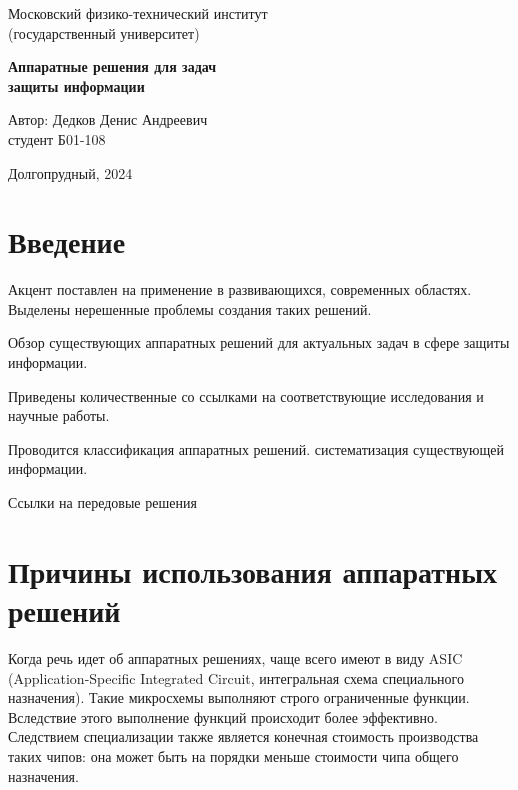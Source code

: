 \documentclass[a4paper,12pt]{article}
\begin{document}
	
\begin{center}
	
        \normalsize Московский физико-технический институт \\
						(государственный университет)
	\vspace{46ex}
	

	\Large \textbf{Аппаратные решения для задач \\ защиты информации}

	\vspace{40ex}
\end{center}
\begin{flushright}
	\normalsize{Автор: Дедков Денис Андреевич \\ студент Б01-108 \\}
\end{flushright}

\vfill

\begin{center}
	Долгопрудный, 2024
\end{center}

\thispagestyle{empty} %

\newpage

\tableofcontents{}
\newpage

\section{Введение}

Акцент поставлен на применение в развивающихся, современных областях. Выделены нерешенные проблемы создания таких решений.

Обзор существующих аппаратных решений для актуальных задач в сфере защиты информации.

Приведены количественные  со ссылками на соответствующие исследования и научные работы. 

Проводится классификация аппаратных решений. систематизация существующей информации.

Ссылки на передовые решения 


\section{Причины использования аппаратных решений}

Когда речь идет об аппаратных решениях, чаще всего имеют в виду ASIC (Application-Specific Integrated Circuit, интегральная схема специального назначения). Такие микросхемы выполняют строго ограниченные функции. Вследствие этого выполнение функций происходит более эффективно. Следствием специализации также является конечная стоимость производства таких чипов: она может быть на порядки меньше стоимости чипа общего назначения. 
\end{document}
